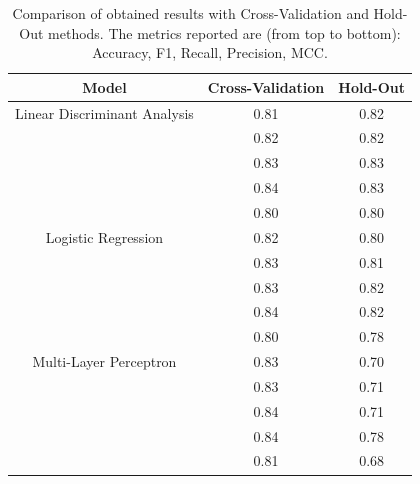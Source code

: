             \begin{table}[htbp]
                \centering
                \caption{Comparison of obtained results with Cross-Validation and Hold-Out methods. The metrics reported are (from top to bottom): Accuracy, F1, Recall, Precision, MCC.}
                \label{tab:feature_engineering_approach_holdout}
                \begin{tabular}{|c|c|c|}
                \hline
                \textbf{Model} & \textbf{Cross-Validation} & \textbf{Hold-Out} \\ \hline
                    Linear Discriminant Analysis    & 0.81 & 0.82 \\ 
                                                    & 0.82 & 0.82 \\ 
                                                    & 0.83 & 0.83 \\ 
                                                    & 0.84 & 0.83 \\
                                                    & 0.80 & 0.80 \\ 
                                                    \hline
                    Logistic Regression             & 0.82 & 0.80 \\ 
                                                    & 0.83 & 0.81 \\ 
                                                    & 0.83 & 0.82 \\ 
                                                    & 0.84 & 0.82 \\
                                                    & 0.80 & 0.78 \\
                                                    \hline
                    Multi-Layer Perceptron          & 0.83 & 0.70 \\ 
                                                    & 0.83 & 0.71 \\ 
                                                    & 0.84 & 0.71 \\
                                                    & 0.84 & 0.78 \\ 
                                                    & 0.81 & 0.68 \\ 
                                                    \hline
                \end{tabular}
            \end{table}

            \newpage

